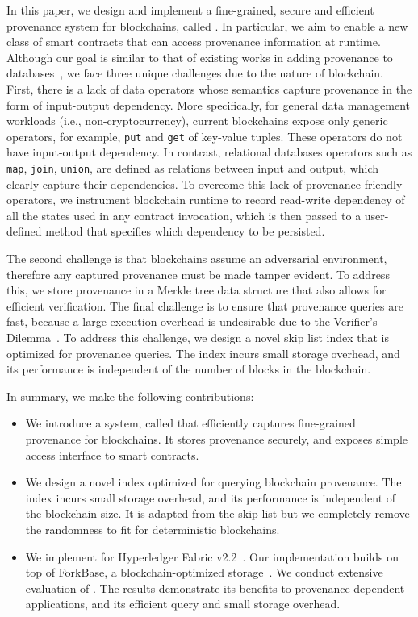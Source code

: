 In this paper, we design and implement a fine-grained, secure and efficient provenance system for blockchains,
called {\fs}. In particular, we aim to enable a new class of smart contracts that can access provenance
information at runtime. Although our goal is similar to that of existing works in adding provenance to
databases~\cite{akoush2013hadoopprov,tian2016agri,psallidas2018smoke}, we face three unique challenges due to
the nature of blockchain. First, there is a lack of data operators whose semantics capture
provenance in the form of input-output dependency. More specifically, for general data management workloads (i.e.,
non-cryptocurrency), current blockchains expose only generic operators, for example, \texttt{put} and \texttt{get}
of key-value tuples. These operators do not have input-output dependency. In contrast, relational databases
operators such as \texttt{map}, \texttt{join}, \texttt{union}, are defined as relations between input and output, which
clearly capture their dependencies. To overcome this lack of provenance-friendly operators, we instrument
blockchain runtime to record read-write dependency of all the states used in any contract invocation, which is
then passed to a user-defined method that specifies which dependency to be persisted. 

The second challenge is that blockchains assume an adversarial environment, therefore any captured provenance
must be made tamper evident. To address this, we store provenance in a Merkle tree data structure
that also allows for efficient verification. The final challenge is to ensure that provenance queries are
fast, because a large execution overhead is undesirable due to the Verifier's
Dilemma~\cite{luu2015demystifying}. To address this challenge, we design a novel skip list index that is optimized
for provenance queries. The index incurs small storage overhead, and its performance is independent of the number of blocks in the blockchain. 

In summary, we make the following contributions: 
\begin{itemize}
  \item We introduce a system, called {\fs} that efficiently captures fine-grained provenance for
  blockchains. It stores provenance securely, and exposes simple access interface to smart contracts. 

  \item We design a novel index optimized for querying blockchain provenance. The index incurs small
  storage overhead, and its performance is independent of the blockchain size. 
  It is adapted from the skip list but we completely remove the randomness to fit for deterministic blockchains. 

  \item We implement {\fs} for Hyperledger Fabric v2.2~\cite{github:fabric}. Our implementation builds on top of
  ForkBase, a blockchain-optimized storage~\cite{wang2018forkbase}. We conduct extensive
  evaluation of {\fs}. The results demonstrate its benefits to provenance-dependent applications, and
  its efficient query and small storage overhead. 
\end{itemize}

